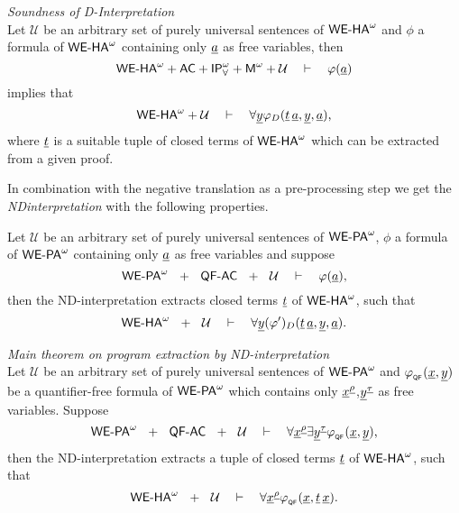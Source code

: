 \begin{thm}{\em Soundness of D-Interpretation \cite{Kohlenbach08}\\}\label{t:sFI}
Let ${\mathcal{U}}$ be an arbitrary set of purely universal sentences of ${\textsf{\upshape WE-HA}}^{\omega}$ and
$\phi$ a formula of ${\textsf{\upshape WE-HA}}^{\omega}$ containing only $\underline a$ as free variables, then 
\[
{\textsf{\upshape WE-HA}}^{\omega} + \textsf{\upshape AC} + \textsf{\upshape IP}^\omega_\forall + \textsf{\upshape M}^\omega + {\mathcal{U}} \quad\vdash\quad \varphi(\underline a)
\]
implies that
\[
{\textsf{\upshape WE-HA}}^{\omega} + {\mathcal{U}} \quad\vdash\quad \forall \underline y\varphi_D(\underline t\,\underline a, \underline y, \underline a)
\text{,}
\]
where $\underline t$ is a suitable tuple of closed terms of ${\textsf{\upshape WE-HA}}^{\omega}$ which can 
be extracted from a given proof.
\end{thm}
In combination with the negative translation as a pre-processing step
we get the {\em ND\nbd in\-ter\-pre\-ta\-tion} with the following properties.
\begin{thm}{}
Let ${\mathcal{U}}$ be an arbitrary set of purely universal sentences of ${\textsf{\upshape WE-PA}}^{\omega}$,
$\phi$ a formula of ${\textsf{\upshape WE-PA}}^{\omega}$ containing only $\underline a$ as free variables 
and suppose
\[
\wepa\ \  +\ \ \QFm\AC\ \ +\ \ {\mathcal{U}}\quad\vdash\quad \phi(\tup a)\text{,}
\]
then the ND-interpretation extracts closed terms $\underline t$ of ${\textsf{\upshape WE-HA}}^{\omega}$, such that
\[
{\textsf{\upshape WE-HA}}^{\omega}\ \  +\ \ {\mathcal{U}}\quad\vdash\quad \forall 
    \underline y(\varphi')_D(\underline t\,\underline a, \underline y,\underline a)\text{.}
\]
\end{thm}
\begin{thm}{\em Main theorem on program extraction by ND-interpretation \cite{Kohlenbach08}\\}
\/Let ${\mathcal{U}}$ be an arbitrary set of purely universal sentences of ${\textsf{\upshape WE-PA}}^{\omega}$ 
and $\varphi_{{}_{\textsf{\upshape QF}}}(\underline x,\underline y)$ be a quantifier-free formula of ${\textsf{\upshape WE-PA}}^{\omega}$ which
contains only $\underline x^{\underline\rho}$,$\underline y^{\underline\tau}$ as free variables. Suppose
\[
\wepa\ \  +\ \ \QFm\AC\ \ +\ \ {\mathcal{U}}\quad\vdash\quad 
  \forall \tup x^{\tup\rho}\exists \tup y^{\tup\tau} \phi_{{}_{\QF}}(\tup x, \tup y)
\text{,}
\]
then the ND-interpretation extracts a tuple of  closed terms $\underline t$ 
of ${\textsf{\upshape WE-HA}}^{\omega}$, such that
\[
{\textsf{\upshape WE-HA}}^{\omega}\ \  +\ \ {\mathcal{U}}\quad\vdash\quad \forall 
    \underline x^{\underline \rho}\varphi_{{}_{\textsf{\upshape QF}}}(\underline x, \underline t\,\underline x)\text{.}
\]
\end{thm}


